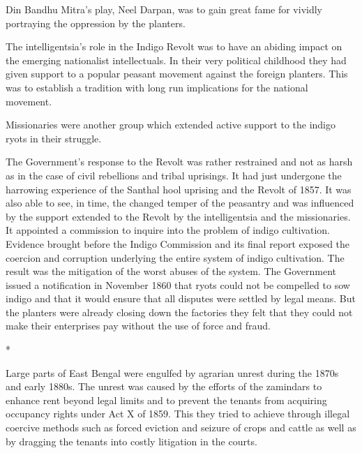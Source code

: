 Din Bandhu Mitra’s play, Neel Darpan, was to gain great fame for vividly portraying the oppression by the planters.

The intelligentsia’s role in the Indigo Revolt was to have an abiding impact on the emerging nationalist intellectuals. In their very political childhood they had given support to a popular peasant movement against the foreign planters. This was to establish a tradition with long run implications for the national movement.

Missionaries were another group which extended active support to the indigo ryots in their struggle.

The Government’s response to the Revolt was rather restrained and not as harsh as in the case of civil rebellions and tribal uprisings. It had just undergone the harrowing experience of the Santhal hool uprising and the Revolt of 1857. It was also able to see, in time, the changed temper of the peasantry and was influenced by the support extended to the Revolt by the intelligentsia and the missionaries. It appointed a commission to inquire into the problem of indigo cultivation. Evidence brought before the Indigo Commission and its final report exposed the coercion and corruption underlying the entire system of indigo cultivation. The result was the mitigation of the worst abuses of the system. The Government issued a notification in November 1860 that ryots could not be compelled to sow indigo and that it would ensure that all disputes were settled by legal means. But the planters were already closing down the factories they felt that they could not make their enterprises pay without the use of force and fraud.

\begin{center}*\end{center}

Large parts of East Bengal were engulfed by agrarian unrest during the 1870s and early 1880s. The unrest was caused by the efforts of the zamindars to enhance rent beyond legal limits and to prevent the tenants from acquiring occupancy rights under Act X of 1859. This they tried to achieve through illegal coercive methods such as forced eviction and seizure of crops and cattle as well as by dragging the tenants into costly litigation in the courts.

